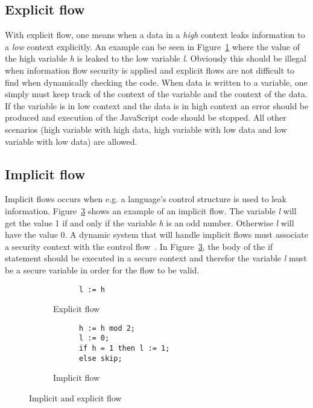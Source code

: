 \subsection{Explicit flow}
With explicit flow, one means when a data in a \emph{high} context leaks information to a \emph{low} context explicitly. An example can be seen in Figure~\ref{fig:expflow} where the value of the high variable \emph{h} is leaked to the low variable \emph{l}. Obviously this should be illegal when information flow security is applied and explicit flows are not difficult to find when dynamically checking the code. When data is written to a variable, one simply must keep track of the context of the variable and the context of the data. If the variable is in low context and the data is in high context an error should be produced and execution of the JavaScript code should be stopped. All other scenarios (high variable with high data, high variable with low data and low variable with low data) are allowed.
\subsection{Implicit flow}
\label{chapter:implicit_flow}
Implicit flows occurs when e.g. a language's control structure is used to leak information. Figure~\ref{fig:impflow} shows an example of an implicit flow. The variable \emph{l} will get the value 1 if and only if the variable \emph{h} is an odd number. Otherwise \emph{l} will have the value 0. A dynamic system that will handle implicit flows must associate a security context with the control flow~\cite{jsflow-csf12}. In Figure~\ref{fig:impflow}, the body of the if statement should be executed in a secure context and therefor the variable \emph{l} must be a secure variable in order for the flow to be valid.

\begin{figure}[h]
  \captionsetup[subfigure]{singlelinecheck=off,justification=raggedright}
  \begin{subfigure}[b]{0.5\textwidth}
    \begin{verbatim}
      l := h
    \end{verbatim}
    \caption{Explicit flow}
    \label{fig:expflow}
  \end{subfigure}
  \begin{subfigure}[b]{0.5\textwidth}
    \begin{verbatim}
      h := h mod 2;
      l := 0;
      if h = 1 then l := 1;
      else skip;
    \end{verbatim}
    \caption{Implicit flow}
    \label{fig:impflow}
  \end{subfigure}
  \caption{Implicit and explicit flow}
\end{figure}

